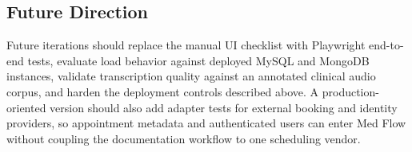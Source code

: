 \subsection{Future Direction}
\label{subsec:discussion-future-direction}

Future iterations should replace the manual UI checklist with Playwright end-to-end tests, evaluate load behavior against deployed MySQL and MongoDB instances, validate transcription quality against an annotated clinical audio corpus, and harden the deployment controls described above. A production-oriented version should also add adapter tests for external booking and identity providers, so appointment metadata and authenticated users can enter Med Flow without coupling the documentation workflow to one scheduling vendor.